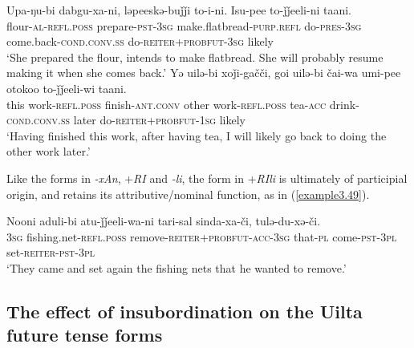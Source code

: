 \documentclass[output=paper,colorlinks,citecolor=brown]{langscibook}
\begin{document}
\ea
\label{example3.47}
\gll Upa-ŋu-bi			dabgu-xa-ni,		ləpeeskə-buǰǰi			to-i-ni. 	Isu-pee				to-ǰǰeeli-ni				taani.\\
    		flour-\textsc{al}-\textsc{refl}.\textsc{poss}	prepare-\textsc{pst}-\textsc{3sg}	make.flatbread-\textsc{purp.refl}	do-\textsc{pres}-\textsc{3sg}
	come.back-\textsc{cond}.\textsc{conv}.\textsc{ss}	do-\textsc{reiter}+\textsc{probfut}-\textsc{3sg}	likely\\
\glt `She prepared the flour, intends to make flatbread. She will probably resume making it when she comes back.’
\ex
\label{example3.48}
\gll Yə	uilə-bi			xoǰi-gačči,		goi		uilə-bi			čai-wa	umi-pee				otokoo	to-ǰǰeeli-wi				taani.\\
    		this	work-\textsc{refl}.\textsc{poss}	finish-\textsc{ant}.\textsc{conv}	other	work-\textsc{refl}.\textsc{poss}	tea-\textsc{acc}
	drink-\textsc{cond}.\textsc{conv}.\textsc{ss}	later		do-\textsc{reiter}+\textsc{probfut}-\textsc{1sg}	likely\\
\glt `Having finished this work, after having tea, I will likely go back to doing the other work later.’
\z

Like the forms in \textit{-xAn}, +\textit{RI} and \textit{-li}, the form in +\textit{RIli} is ultimately of participial origin, and retains its attributive/nominal function, as in (\ref{example3.49}).

\ea
\label{example3.49}
\gll Nooni	aduli-bi				atu-ǰǰeeli-wa-ni					tari-sal	sinda-xa-či, tulə-du-xə-či.\\
    		\textsc{3sg}		fishing.net-\textsc{refl}.\textsc{poss}	remove-\textsc{reiter}+\textsc{probfut}-\textsc{acc}-\textsc{3sg}	that-\textsc{pl}	come-\textsc{pst}-\textsc{3pl}
	set-\textsc{reiter}-\textsc{pst}-\textsc{3pl}\\
\glt `They came and set again the fishing nets that he wanted to remove.’
\z


\subsection{The effect of insubordination on the Uilta future tense forms}\label{Section3.5.5}
\end{document}
